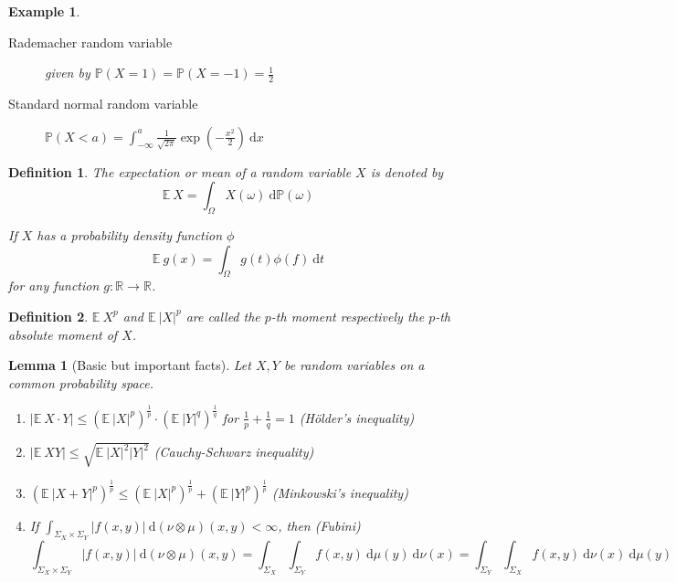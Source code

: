 \documentclass[10pt,a4paper]{article}
\theoremstyle{thmstyle}
\newtheorem{definition}{Definition}
\newtheorem{lemma}{Lemma}
\newtheorem{example}{Example}
\newcommand{\diff}{~\mathrm{d}}
\newcommand{\E}{\mathbb{E}~}
\renewcommand{\Pr}[1]{\mathbb{P}\left( #1 \right)}
\begin{document}
\begin{example}
  \begin{description}
  \item[Rademacher random variable] given by $\Pr{X = 1} = \Pr{X = -1} = \frac{1}{2}$
  \item[Standard normal random variable] $\Pr{X < a} = \int_{-\infty}^{a} \frac{1}{\sqrt{2\pi}} \exp\left( -\frac{x^{2}}{2} \right) \diff x$
  \end{description}
\end{example}

\begin{definition}
  The \emph{expectation} or \emph{mean} of a random variable $X$ is denoted by
  \begin{equation*}
    \E X = \int_{\Omega} X(\omega) \diff \mathbb{P}(\omega)
  \end{equation*}

  If $X$ has a probability density function $\phi$
  \begin{equation*}
    \E g(x) = \int_{\Omega} g(t) \phi(f) \diff t
  \end{equation*}
  for any function $g : \mathbb{R} \rightarrow \mathbb{R}$.
\end{definition}

\begin{definition}
  $\E X^{p}$ and $\E |X|^{p}$ are called the \emph{$p$-th moment} respectively the \emph{$p$-th absolute moment} of $X$.
\end{definition}

\begin{lemma}[Basic but important facts]
  Let $X, Y$ be random variables on a common probability space.
  \begin{enumerate}
  \item $|\E X \cdot Y| \le \left( \E |X|^{p} \right)^{\frac{1}{p}} \cdot \left( \E |Y|^{q} \right)^{\frac{1}{q}}$ for $\frac{1}{p} + \frac{1}{q} = 1$ (Hölder's inequality)
  \item $|\E XY| \le \sqrt{\E |X|^{2} |Y|^{2}}$ (Cauchy-Schwarz inequality)
  \item $\left( \E |X + Y|^{p} \right)^{\frac{1}{p}} \le \left( \E |X|^{p} \right)^{\frac{1}{p}} + \left( \E |Y|^{p} \right)^{\frac{1}{p}}$ (Minkowski's inequality)
  \item If $\int_{\Sigma_{X} \times \Sigma_{Y}} |f(x, y)| \diff (\nu \otimes \mu)(x, y) < \infty$, then (Fubini)
    \begin{equation*}
      \int_{\Sigma_{X} \times \Sigma_{Y}} |f(x, y)| \diff (\nu \otimes \mu)(x, y) = \int_{\Sigma_{X}} \int_{\Sigma_{Y}} f(x, y) \diff \mu(y) \diff \nu(x) = \int_{\Sigma_{Y}} \int_{\Sigma_{X}} f(x, y) \diff \nu(x) \diff \mu(y)
    \end{equation*}
  \end{enumerate}
\end{lemma}
\end{document}
